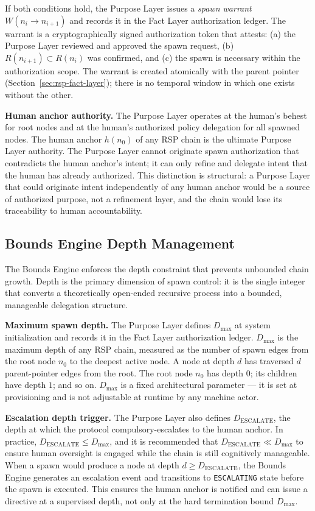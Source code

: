 If both conditions hold, the Purpose Layer issues a \emph{spawn warrant} $W(n_i \to n_{i+1})$ and records it in the Fact Layer authorization ledger. The warrant is a cryptographically signed authorization token that attests: (a) the Purpose Layer reviewed and approved the spawn request, (b) $R(n_{i+1}) \subset R(n_i)$ was confirmed, and (c) the spawn is necessary within the authorization scope. The warrant is created atomically with the parent pointer (Section~\ref{sec:rsp-fact-layer}); there is no temporal window in which one exists without the other.

\medskip
\noindent\textbf{Human anchor authority.} The Purpose Layer operates at the human's behest for root nodes and at the human's authorized policy delegation for all spawned nodes. The human anchor $h(n_0)$ of any RSP chain is the ultimate Purpose Layer authority. The Purpose Layer cannot originate spawn authorization that contradicts the human anchor's intent; it can only refine and delegate intent that the human has already authorized. This distinction is structural: a Purpose Layer that could originate intent independently of any human anchor would be a source of authorized purpose, not a refinement layer, and the chain would lose its traceability to human accountability.

\subsection{Bounds Engine Depth Management}
\label{sec:rsp-bounds-engine}

The Bounds Engine enforces the depth constraint that prevents unbounded chain growth. Depth is the primary dimension of spawn control: it is the single integer that converts a theoretically open-ended recursive process into a bounded, manageable delegation structure.

\medskip
\noindent\textbf{Maximum spawn depth.} The Purpose Layer defines $D_{\max}$ at system initialization and records it in the Fact Layer authorization ledger. $D_{\max}$ is the maximum depth of any RSP chain, measured as the number of spawn edges from the root node $n_0$ to the deepest active node. A node at depth $d$ has traversed $d$ parent-pointer edges from the root. The root node $n_0$ has depth $0$; its children have depth $1$; and so on. $D_{\max}$ is a fixed architectural parameter --- it is set at provisioning and is not adjustable at runtime by any machine actor.

\medskip
\noindent\textbf{Escalation depth trigger.} The Purpose Layer also defines $D_{\mathrm{ESCALATE}}$, the depth at which the protocol compulsory-escalates to the human anchor. In practice, $D_{\mathrm{ESCALATE}} \leq D_{\max}$, and it is recommended that $D_{\mathrm{ESCALATE}} \ll D_{\max}$ to ensure human oversight is engaged while the chain is still cognitively manageable. When a spawn would produce a node at depth $d \geq D_{\mathrm{ESCALATE}}$, the Bounds Engine generates an escalation event and transitions to \texttt{ESCALATING} state before the spawn is executed. This ensures the human anchor is notified and can issue a directive at a supervised depth, not only at the hard termination bound $D_{\max}$.

